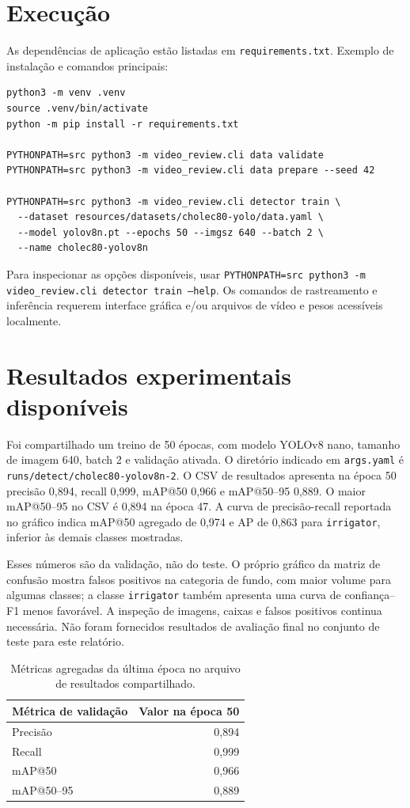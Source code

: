 \documentclass[12pt,a4paper]{article}
\begin{document}
\section{Execução}

As dependências de aplicação estão listadas em \texttt{requirements.txt}. Exemplo de instalação e comandos principais:

\begin{lstlisting}[style=terminal]
python3 -m venv .venv
source .venv/bin/activate
python -m pip install -r requirements.txt

PYTHONPATH=src python3 -m video_review.cli data validate
PYTHONPATH=src python3 -m video_review.cli data prepare --seed 42

PYTHONPATH=src python3 -m video_review.cli detector train \
  --dataset resources/datasets/cholec80-yolo/data.yaml \
  --model yolov8n.pt --epochs 50 --imgsz 640 --batch 2 \
  --name cholec80-yolov8n
\end{lstlisting}

Para inspecionar as opções disponíveis, usar \texttt{PYTHONPATH=src python3 -m video\_review.cli detector train --help}. Os comandos de rastreamento e inferência requerem interface gráfica e/ou arquivos de vídeo e pesos acessíveis localmente.

\section{Resultados experimentais disponíveis}

Foi compartilhado um treino de 50 épocas, com modelo YOLOv8 nano, tamanho de imagem 640, batch 2 e validação ativada. O diretório indicado em \texttt{args.yaml} é \texttt{runs/detect/cholec80-yolov8n-2}. O CSV de resultados apresenta na época 50 precisão 0,894, recall 0,999, mAP@50 0,966 e mAP@50--95 0,889. O maior mAP@50--95 no CSV é 0,894 na época 47. A curva de precisão-recall reportada no gráfico indica mAP@50 agregado de 0,974 e AP de 0,863 para \texttt{irrigator}, inferior às demais classes mostradas.

Esses números são da validação, não do teste. O próprio gráfico da matriz de confusão mostra falsos positivos na categoria de fundo, com maior volume para algumas classes; a classe \texttt{irrigator} também apresenta uma curva de confiança--F1 menos favorável. A inspeção de imagens, caixas e falsos positivos continua necessária. Não foram fornecidos resultados de avaliação final no conjunto de teste para este relatório.

\begin{table}[ht]
\centering
\caption{Métricas agregadas da última época no arquivo de resultados compartilhado.}
\begin{tabular}{lr}
\toprule
\textbf{Métrica de validação} & \textbf{Valor na época 50} \\
\midrule
Precisão & 0,894 \\
Recall & 0,999 \\
mAP@50 & 0,966 \\
mAP@50--95 & 0,889 \\
\bottomrule
\end{tabular}
\end{table}
\end{document}
